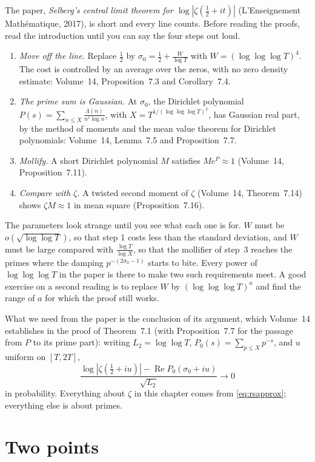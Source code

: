 The paper, \emph{Selberg's central limit theorem for $\log|\zeta(\frac12+it)|$} (L'Enseignement Math\'ematique, 2017), is short and every line counts. Before reading the proofs, read the introduction until you can say the four steps out loud.
\begin{enumerate}
\item \emph{Move off the line.} Replace $\frac12$ by $\sigma_0=\frac12+\frac W{\log T}$ with $W=(\log\log\log T)^4$. The cost is controlled by an average over the zeros, with no zero density estimate: Volume~14, Proposition~7.3 and Corollary~7.4.
\item \emph{The prime sum is Gaussian.} At $\sigma_0$, the Dirichlet polynomial $P(s)=\sum_{n\le X}\frac{\Lambda(n)}{n^s\log n}$, with $X=T^{1/(\log\log\log T)^2}$, has Gaussian real part, by the method of moments and the mean value theorem for Dirichlet polynomials: Volume~14, Lemma~7.5 and Proposition~7.7.
\item \emph{Mollify.} A short Dirichlet polynomial $M$ satisfies $Me^P\approx1$ (Volume~14, Proposition~7.11).
\item \emph{Compare with $\zeta$.} A twisted second moment of $\zeta$ (Volume~14, Theorem~7.14) shows $\zeta M\approx1$ in mean square (Proposition~7.16).
\end{enumerate}
The parameters look strange until you see what each one is for. $W$ must be $o(\sqrt{\log\log T})$, so that step 1 costs less than the standard deviation, and $W$ must be large compared with $\frac{\log T}{\log X}$, so that the mollifier of step~3 reaches the primes where the damping $p^{-(2\sigma_0-1)}$ starts to bite. Every power of $\log\log\log T$ in the paper is there to make two such requirements meet. A good exercise on a second reading is to replace $W$ by $(\log\log\log T)^a$ and find the range of $a$ for which the proof still works.

What we need from the paper is the conclusion of its argument, which Volume~14 establishes in the proof of Theorem~7.1 (with Proposition~7.7 for the passage from $P$ to its prime part): writing $L_2=\log\log T$, $P_0(s)=\sum_{p\le X}p^{-s}$, and $u$ uniform on $[T,2T]$,
\begin{equation}\label{eq:rsapprox}
\frac{\log|\zeta(\frac12+iu)|-\operatorname{Re}P_0(\sigma_0+iu)}{\sqrt{L_2}}\longrightarrow0
\end{equation}
in probability. 
Everything about $\zeta$ in this chapter comes from \eqref{eq:rsapprox}; everything else is about primes.

\section{Two points}

